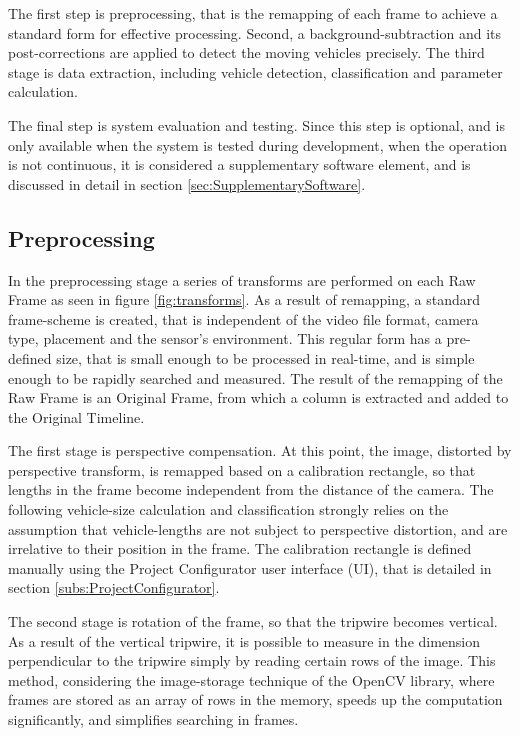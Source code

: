 
The first step is preprocessing, that is the remapping of each frame to achieve a standard form for effective processing.
Second, a background-subtraction and its post-corrections are applied to detect the moving vehicles precisely.
The third stage is data extraction, including vehicle detection, classification and parameter calculation.

The final step is system evaluation and testing. 
Since this step is optional, and is only available when the system is tested during development, when the operation is not continuous, it is considered a supplementary software element, and is discussed in detail in section \ref{sec:SupplementarySoftware}.
\subsection{Preprocessing}\label{sec:preprocessing}
In the preprocessing stage a series of transforms are performed on each Raw Frame as seen in figure \ref{fig:transforms}.
As a result of remapping, a standard frame-scheme is created, that is independent of the video file format, camera type, placement and the sensor's environment.
This regular form has a pre-defined size, that is small enough to be processed in real-time, and is simple enough to be rapidly searched and measured.
The result of the remapping of the Raw Frame is an Original Frame, from which a column is extracted and added to the Original Timeline.

The first stage is perspective compensation.
At this point, the image, distorted by perspective transform, is remapped based on a calibration rectangle, so that lengths in the frame become independent from the distance of the camera.
The following vehicle-size calculation and classification strongly relies on the assumption that vehicle-lengths are not subject to perspective distortion, and are irrelative to their position in the frame.
The calibration rectangle is defined manually using the Project Configurator user interface (UI), that is detailed in section \ref{subs:ProjectConfigurator}.

The second stage is rotation of the frame, so that the tripwire becomes vertical.
As a result of the vertical tripwire, it is possible to measure in the dimension perpendicular to the tripwire simply by reading certain rows of the image.
This method, considering the image-storage technique of the OpenCV library, where frames are stored as an array of rows in the memory, speeds up the computation significantly, and simplifies searching in frames.

